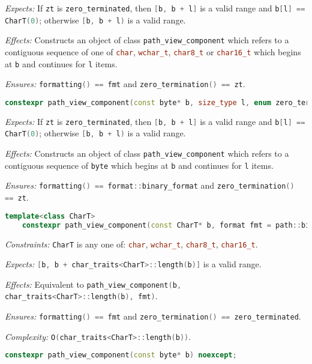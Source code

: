 \documentclass[11pt]{article}
\newcommand{\code}[2][cpp]{\lstinline[language=#1,basicstyle=\small\ttfamily]{#2}}
\newcommand{\desc}[1]{\textit{#1}}
\newcommand{\constraints}{\desc{Constraints: }}
\newcommand{\effects}{\desc{Effects: }}
\newcommand{\expects}{\desc{Expects: }}
\newcommand{\ensures}{\desc{Ensures: }}
\newcommand{\complexity}{\desc{Complexity: }}
\begin{document}
\expects If \code{zt} is \code{zero_terminated}, then \code{[b, b + l]} is a valid range and \code{b[l] == CharT(0)}; otherwise \code{[b, b + l)} is a valid range.

\effects Constructs an object of class \code{path_view_component} which refers to a contiguous sequence of one of \code{char}, \code{wchar_t}, \code{char8_t} or \code{char16_t} which begins at \code{b} and continues for \code{l} items.

\ensures \code{formatting() == fmt} and \code{zero_termination() == zt}.\\

\begin{lstlisting}[language=cpp]
    constexpr path_view_component(const byte* b, size_type l, enum zero_termination zt) noexcept;
\end{lstlisting}

\expects If \code{zt} is \code{zero_terminated}, then \code{[b, b + l]} is a valid range and \code{b[l] == CharT(0)}; otherwise \code{[b, b + l)} is a valid range.

\effects Constructs an object of class \code{path_view_component} which refers to a contiguous sequence of \code{byte} which begins at \code{b} and continues for \code{l} items.

\ensures \code{formatting() == format::binary_format} and \code{zero_termination() == zt}.\\


\begin{lstlisting}[language=cpp]
    template<class CharT>
    constexpr path_view_component(const CharT* b, format fmt = path::binary_format) noexcept;
\end{lstlisting}
\constraints \code{CharT} is any one of: \code{char}, \code{wchar_t}, \code{char8_t}, \code{char16_t}.

\expects \code{[b, b + char_traits<CharT>::length(b)]} is a valid range.

\effects Equivalent to \code{path_view_component(b, char_traits<CharT>::length(b), fmt)}.

\ensures \code{formatting() == fmt} and \code{zero_termination() == zero_terminated}.

\complexity \code{O(char_traits<CharT>::length(b))}.\\

\begin{lstlisting}[language=cpp]
    constexpr path_view_component(const byte* b) noexcept;
\end{lstlisting}
\end{document}
